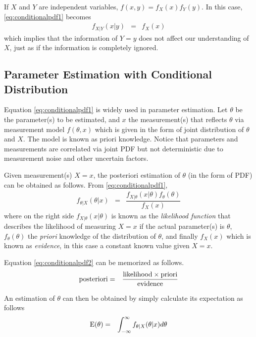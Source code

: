 If $X$ and $Y$ are independent variables, $f(x,y) = f_X(x)f_Y(y)$. In this case, \eqref{eq:conditionalpdf1} becomes
\begin{eqnarray}
  f_{X|Y}(x|y) &=& f_X(x) \nonumber
\end{eqnarray}
which implies that the information of $Y=y$ does not affect our understanding of $X$, just as if the information is completely ignored.

\subsection{Parameter Estimation with Conditional Distribution}

Equation \eqref{eq:conditionalpdf1} is widely used in parameter estimation. Let $\theta$ be the parameter(s) to be estimated, and $x$ the measurement(s) that reflects $\theta$ via measurement model $f(\theta, x)$ which is given in the form of joint distribution of $\theta$ and $X$. The model is known as priori knowledge. Notice that parameters and measurements are correlated via joint PDF but not deterministic due to measurement noise and other uncertain factors.

Given measurement(s) $X=x$, the posteriori estimation of $\theta$ (in the form of PDF) can be obtained as follows. From \eqref{eq:conditionalpdf1},
\begin{eqnarray}
  f_{\theta|X}(\theta|x) &=& \dfrac{f_{X|\theta}(x|\theta)f_\theta(\theta)}{f_X(x)} \label{eq:conditionalpdf2}
\end{eqnarray}
where on the right side $f_{X|\theta}(x|\theta)$ is known as the \textit{likelihood function} that describes the likelihood of measuring $X=x$ if the actual parameter(s) is $\theta$, $f_\theta(\theta)$ the \textit{priori} knowledge of the distribution of $\theta$, and finally $f_X(x)$ which is known as \textit{evidence}, in this case a constant known value given $X=x$.

Equation \eqref{eq:conditionalpdf2} can be memorized as follows.
\begin{eqnarray}
  \textup{posteriori} &=& \dfrac{\textup{likelihood}\times\textup{priori}}{\textup{evidence}} \nonumber
\end{eqnarray}

An estimation of $\theta$ can then be obtained by simply calculate its expectation as follows
\begin{eqnarray}
  \textup{E}(\theta) &=& \int_{-\infty}^{\infty} f_{\theta|X}(\theta|x) d\theta \nonumber
\end{eqnarray}

